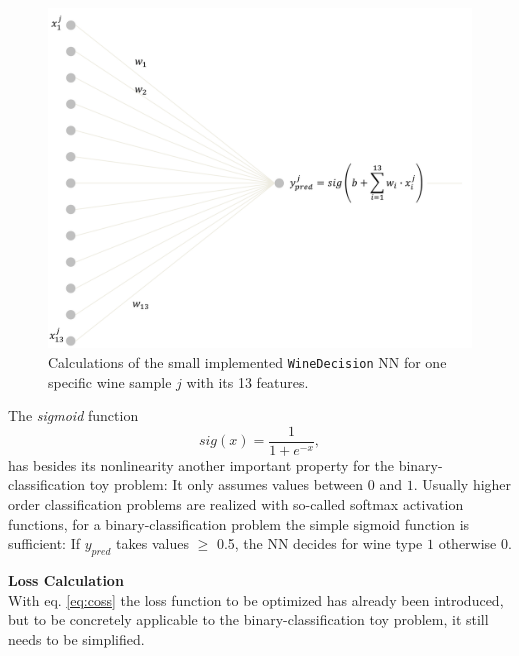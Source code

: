 \begin{figure}
	\centering
	\includegraphics[scale=0.7]{images/neuron.png}
\caption[Example for a small NN]{Calculations of the small implemented \texttt{WineDecision} NN for one specific wine sample $j$ with its 13 features.}
\label{fig:neuron}
\end{figure}
The \textit{sigmoid} function
\begin{equation}
    sig(x) = \frac{1}{1+e^{-x}},
\end{equation}
has besides its nonlinearity another important property for the binary-classification toy problem: It only assumes values between $0$ and $1$. Usually higher order classification problems are realized with so-called softmax activation functions, for a binary-classification problem the simple sigmoid function is sufficient: If $y_{pred}$ takes values $\geq$ 0.5, the NN decides for wine type $1$ otherwise $0$.

\textbf{Loss Calculation}\\
With eq. \ref{eq:coss} the loss function to be optimized has already been introduced, but to be concretely applicable to the binary-classification toy problem, it still needs to be simplified.

